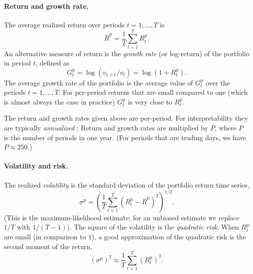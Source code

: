 \documentclass[openany]{article}  %
\newcommand{\Rp}{R^\mathrm{p}}
\newcommand{\Gp}{G^\mathrm{p}}
\begin{document}
\paragraph{Return and growth rate.}
The average realized return over periods $t=1,\ldots, T$ is
\[
\overline \Rp =  \frac{1}{T} \sum_{t=1}^{T} \Rp_t.
\]
An alternative measure of return is the \emph{growth rate} (or log-return)
of the portfolio in period $t$, defined as
\[
\Gp_t = \log (v_{t+1} / v_t ) = \log (1+\Rp_t).
\]
The average growth rate of the portfolio
is the average value of $\Gp_t$ over the periods $t=1, \ldots, T$.
For per-period returns that are small compared to one (which is
almost always the case in practice) $\Gp_t$ is very close to $\Rp_t$.

The return and growth rates given above are per-period. For interpretability
they are typically \emph{annualized} \cite{bacon2008practical}:
Return and growth rates are multiplied by $P$,
where $P$ is the number of periods in one year.
(For periods that are trading days, we have $P\approx 250$.)

\paragraph{Volatility and risk.}
The realized \emph{volatility} \cite{black1976volatility} is the standard deviation of the portfolio
return time series,
\[
\sigma^\mathrm{p} = \left( \frac{1}{T} \sum_{t=1}^{T} (\Rp_t - \overline \Rp)^2
\right)^{1/2}.
\]
(This is the maximum-likelihood estimate; for an unbiased estimate we replace
$1/T$ with $1/(T-1)$).
The square of the volatility is the \emph{quadratic risk}.
When $\Rp_t$ are small (in comparison to $1$),
a good approximation of the quadratic risk is the
second moment of the return,
\[
(\sigma^\mathrm{p})^2 \approx
\frac{1}{T} \sum_{t=1}^{T} (\Rp_t)^2.
\]

\end{document}
